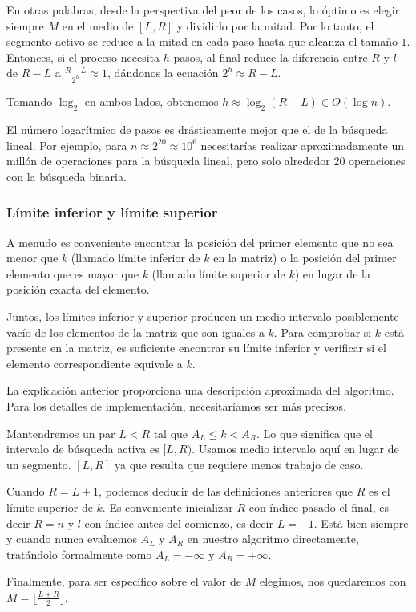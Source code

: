 En otras palabras, desde la perspectiva del peor de los casos, lo óptimo es elegir siempre $M$ en el medio de $[L, R]$ y dividirlo por la mitad. Por lo tanto, el segmento activo se reduce a la mitad en cada paso hasta que alcanza el tamaño $1$. Entonces, si el proceso necesita $h$ pasos, al final reduce la diferencia entre $R$ y $l$ de $R-L$ a $\frac{R-L}{2^h} \approx 1$, dándonos la ecuación $2^h \approx R-L$.

Tomando $\log_2$ en ambos lados, obtenemos $h \approx \log_2(R-L) \in O(\log n)$.

El número logarítmico de pasos es drásticamente mejor que el de la búsqueda lineal. Por ejemplo, para $n \approx 2^{20} \approx 10^6$ necesitarías realizar aproximadamente un millón de operaciones para la búsqueda lineal, pero solo alrededor $20$ operaciones con la búsqueda binaria.

\subsubsection{Límite inferior y límite superior}

A menudo es conveniente encontrar la posición del primer elemento que no sea menor que $k$ (llamado límite inferior de $k$ en la matriz) o la posición del primer elemento que es mayor que $k$ (llamado límite superior de $k$) en lugar de la posición exacta del elemento.

Juntos, los límites inferior y superior producen un medio intervalo posiblemente vacío de los elementos de la matriz que son iguales a $k$. Para comprobar si $k$ está presente en la matriz, es suficiente encontrar su límite inferior y verificar si el elemento correspondiente equivale a $k$.

La explicación anterior proporciona una descripción aproximada del algoritmo. Para los detalles de implementación, necesitaríamos ser más precisos.

Mantendremos un par $L <R$ tal que $A_L \leq k < A_R$. Lo que significa que el intervalo de búsqueda activa es $[L, R)$. Usamos medio intervalo aquí en lugar de un segmento. $[L, R]$ ya que resulta que requiere menos trabajo de caso.

Cuando $R = L+1$, podemos deducir de las definiciones anteriores que $R$ es el límite superior de $k$. Es conveniente inicializar $R$ con índice pasado el final, es decir $R=n$ y $l$ con índice antes del comienzo, es decir $L=-1$. Está bien siempre y cuando nunca evaluemos $A_L$ y $A_R$ en nuestro algoritmo directamente, tratándolo formalmente como $A_L = -\infty$ y $A_R = +\infty$.

Finalmente, para ser específico sobre el valor de $M$ elegimos, nos quedaremos con $M = \lfloor \frac{L+R}{2} \rfloor$.